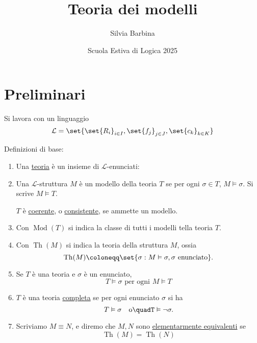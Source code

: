 \documentclass[10pt]{article}
\author{Silvia Barbina}
\date{Scuola Estiva di Logica 2025}
\title{Teoria dei modelli}
\newcommand{\1}{\mathds{1}}
\theoremstyle{definition}%
\theoremstyle{plain}
\theoremstyle{remark}
\begin{document}
\maketitle
\tableofcontents

\begin{latex}
\clearpage
\end{latex}
\section{Preliminari}
\label{sec:org4708d21}

Si lavora con un linguaggio
\begin{equation*}
\mathcal{L} = \set{\set{R_{i}}_{i \in I}, \set{f_{j}}_{j \in J}, \set{c_{k}}_{k \in K}}
\end{equation*}

Definizioni di base:
\begin{enumerate}
\item Una \uline{teoria} è un insieme di \(\mathcal{L}\)-enunciati:
\item Una \(\mathcal{L}\)-struttura \(M\) è un modello della teoria \(T\) se per ogni \(\sigma \in T\), \(M\vDash \sigma\). Si scrive \(M\vDash T\).

\(T\) è \uline{coerente}, o \uline{consistente}, se ammette un modello.
\item Con \(\operatorname{Mod}(T)\) si indica la classe di tutti i modelli tella teoria \(T\).
\item Con \(\operatorname{Th}(M)\) si indica la teoria della struttura \(M\), ossia
\begin{equation*}
 \operatorname{Th}(M) \coloneqq\set{\sigma: M\vDash\sigma,\sigma\text{ enunciato}}.
\end{equation*}
\item Se \(T\) è una teoria e \(\sigma\) è un enunciato,
\begin{equation*}
 T\vDash\sigma\text{ per ogni }M\vDash T
\end{equation*}
\item \(T\) è una teoria \uline{completa} se per ogni enunciato \(\sigma\) si ha
\begin{equation*}
 T\vDash \sigma\quad\text{o}\quadT\vDash\lnot\sigma.
\end{equation*}
\item Scriviamo \(M\equiv N\), e diremo che \(M,N\) sono \uline{elementarmente equivalenti} se
\begin{equation*}
 \operatorname{Th}(M)=\operatorname{Th}(N)
\end{equation*}
\end{enumerate}
\end{document}
